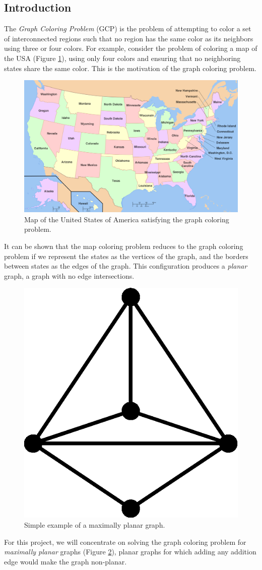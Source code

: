 \documentclass{article}
\begin{document}
\begin{multicols}{2}
\section{Introduction}
The \textit{Graph Coloring Problem} (GCP) is the problem of attempting to color a set of interconnected regions such that no region has the same color as its neighbors using three or four colors. For example, consider the problem of coloring a map of the USA (Figure \ref{usa}), using only four colors and ensuring that no neighboring states share the same color. This is the motivation of the graph coloring problem. 
\begin{figure}[H]
	\centering
	\includegraphics[width=\linewidth]{images/usa}
	\caption{Map of the United States of America satisfying the graph coloring problem.}
	\label{usa}
\end{figure}
It can be shown that the map coloring problem reduces to the graph coloring problem if we represent the states as the vertices of the graph, and the borders between states as the edges of the graph\cite{ai}. This configuration produces a \textit{planar} graph, a graph with no edge intersections. 
\begin{figure}[H]
	\centering
	\includegraphics[width=0.4\linewidth]{images/simple_graph}
	\caption{Simple example of a maximally planar graph.}
	\label{simple}
\end{figure}
For this project, we will concentrate on solving the graph coloring problem for \textit{maximally planar} graphs (Figure \ref{simple}), planar graphs for which adding any addition edge would make the graph non-planar.


\end{multicols}
\end{document}
